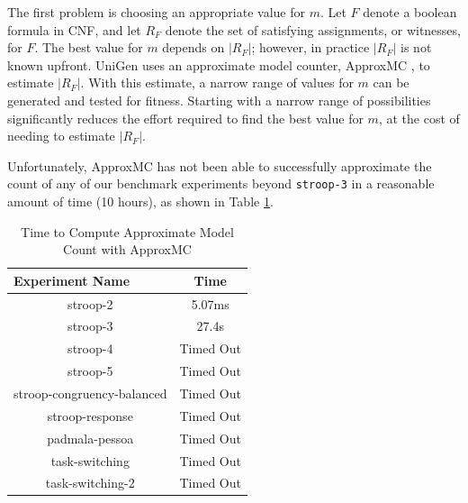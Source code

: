 The first problem is choosing an appropriate value for $m$. Let $F$ denote a boolean formula in CNF, and let $R_F$ denote the set of satisfying assignments, or witnesses, for $F$. The best value for $m$ depends on $|R_F|$; however, in practice $|R_F|$ is not known upfront. UniGen uses an approximate model counter, ApproxMC \cite{DBLP:journals/corr/ChakrabortyMV13}, to estimate $|R_F|$. With this estimate, a narrow range of values for $m$ can be generated and tested for fitness. Starting with a narrow range of possibilities significantly reduces the effort required to find the best value for $m$, at the cost of needing to estimate $|R_F|$.

Unfortunately, ApproxMC has not been able to successfully approximate the count of any of our benchmark experiments beyond \texttt{stroop-3} in a reasonable amount of time (10 hours), as shown in Table \ref{tab:benchmark_experiments_approxmc}.


\begin{table}[htb]
  \centering
  \caption{Time to Compute Approximate Model Count with ApproxMC}
\begin{tabular}{|c|c|}
\hline
\multicolumn{1}{|l|}{Experiment Name} & Time            \\ \hline
stroop-2                              & 5.07ms          \\ \hline
stroop-3                              & 27.4s           \\ \hline
stroop-4                              & Timed Out       \\ \hline
stroop-5                              & Timed Out       \\ \hline
stroop-congruency-balanced            & Timed Out       \\ \hline
stroop-response                       & Timed Out       \\ \hline
padmala-pessoa                        & Timed Out       \\ \hline
task-switching                        & Timed Out       \\ \hline
task-switching-2                      & Timed Out       \\ \hline
\end{tabular}
\label{tab:benchmark_experiments_approxmc}%
\end{table}

